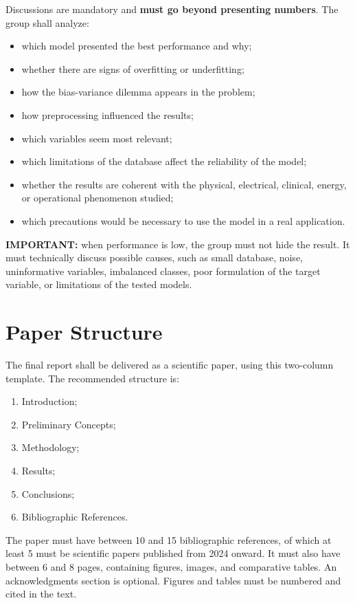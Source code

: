 \documentclass[a4paper]{ifacconf}
\begin{document}
Discussions are mandatory and \textbf{must go beyond presenting numbers}. The group shall analyze:
\begin{itemize}
    \item which model presented the best performance and why;
    \item whether there are signs of overfitting or underfitting;
    \item how the bias-variance dilemma appears in the problem;
    \item how preprocessing influenced the results;
    \item which variables seem most relevant;
    \item which limitations of the database affect the reliability of the model;
    \item whether the results are coherent with the physical, electrical, clinical, energy, or operational phenomenon studied;
    \item which precautions would be necessary to use the model in a real application.
\end{itemize}

\textbf{IMPORTANT:} when performance is low, the group must not hide the result. It must technically discuss possible causes, such as small database, noise, uninformative variables, imbalanced classes, poor formulation of the target variable, or limitations of the tested models.

\section{Paper Structure}

The final report shall be delivered as a scientific paper, using this two-column template. The recommended structure is:

\begin{enumerate}
    \item Introduction;
    \item Preliminary Concepts; 
    \item Methodology;
    \item Results;
    \item Conclusions;
    \item Bibliographic References.     
\end{enumerate}

The paper must have between 10 and 15 bibliographic references, of which at least 5 must be scientific papers published from 2024 onward. It must also have between 6 and 8 pages, containing figures, images, and comparative tables. An acknowledgments section is optional. Figures and tables must be numbered and cited in the text.
\end{document}
